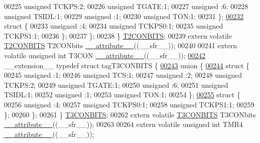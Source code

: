 \begin{DoxyCode}
00225       \textcolor{keywordtype}{unsigned} TCKPS:2;
00226       \textcolor{keywordtype}{unsigned} TGATE:1;
00227       \textcolor{keywordtype}{unsigned} :6;
00228       \textcolor{keywordtype}{unsigned} TSIDL:1;
00229       \textcolor{keywordtype}{unsigned} :1;
00230       \textcolor{keywordtype}{unsigned} TON:1;
00231     \};
\hypertarget{a00015_source_l00232}{}\hyperlink{a00015}{00232}     \textcolor{keyword}{struct }\{
00233       \textcolor{keywordtype}{unsigned} :4;
00234       \textcolor{keywordtype}{unsigned} TCKPS0:1;
00235       \textcolor{keywordtype}{unsigned} TCKPS1:1;
00236     \};
00237   \};
00238 \} \hyperlink{a00014_da/db8/a00797}{T2CONBITS};
00239 \textcolor{keyword}{extern} \textcolor{keyword}{volatile} \hyperlink{a00014_da/db8/a00797}{T2CONBITS} T2CONbits \hyperlink{a00015_a493c46f03454991ccc5aa7a6e1dfb2a7}{\_\_attribute\_\_}((\_\_sfr\_\_));
00240 
00241 \textcolor{keyword}{extern} \textcolor{keyword}{volatile} \textcolor{keywordtype}{unsigned} \textcolor{keywordtype}{int}  T3CON \hyperlink{a00015_a493c46f03454991ccc5aa7a6e1dfb2a7}{\_\_attribute\_\_}((\_\_sfr\_\_));
\hypertarget{a00015_source_l00242}{}\hyperlink{a00014}{00242} \_\_extension\_\_ \textcolor{keyword}{typedef} \textcolor{keyword}{struct }tagT3CONBITS \{
\hypertarget{a00015_source_l00243}{}\hyperlink{a00015}{00243}   \textcolor{keyword}{union }\{
\hypertarget{a00015_source_l00244}{}\hyperlink{a00015}{00244}     \textcolor{keyword}{struct }\{
00245       \textcolor{keywordtype}{unsigned} :1;
00246       \textcolor{keywordtype}{unsigned} TCS:1;
00247       \textcolor{keywordtype}{unsigned} :2;
00248       \textcolor{keywordtype}{unsigned} TCKPS:2;
00249       \textcolor{keywordtype}{unsigned} TGATE:1;
00250       \textcolor{keywordtype}{unsigned} :6;
00251       \textcolor{keywordtype}{unsigned} TSIDL:1;
00252       \textcolor{keywordtype}{unsigned} :1;
00253       \textcolor{keywordtype}{unsigned} TON:1;
00254     \};
\hypertarget{a00015_source_l00255}{}\hyperlink{a00015}{00255}     \textcolor{keyword}{struct }\{
00256       \textcolor{keywordtype}{unsigned} :4;
00257       \textcolor{keywordtype}{unsigned} TCKPS0:1;
00258       \textcolor{keywordtype}{unsigned} TCKPS1:1;
00259     \};
00260   \};
00261 \} \hyperlink{a00014_df/d0e/a00800}{T3CONBITS};
00262 \textcolor{keyword}{extern} \textcolor{keyword}{volatile} \hyperlink{a00014_df/d0e/a00800}{T3CONBITS} T3CONbits \hyperlink{a00015_a493c46f03454991ccc5aa7a6e1dfb2a7}{\_\_attribute\_\_}((\_\_sfr\_\_));
00263 
00264 \textcolor{keyword}{extern} \textcolor{keyword}{volatile} \textcolor{keywordtype}{unsigned} \textcolor{keywordtype}{int}  TMR4 \hyperlink{a00015_a493c46f03454991ccc5aa7a6e1dfb2a7}{\_\_attribute\_\_}((\_\_sfr\_\_));

\end{DoxyCode}
